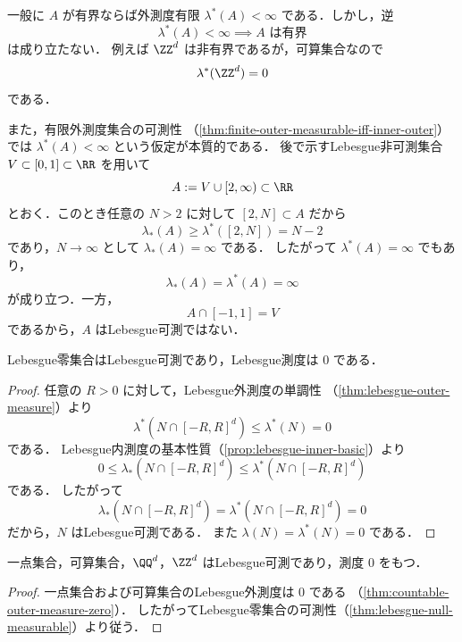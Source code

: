 \begin{remark}
一般に $A$ が有界ならば外測度有限 $\lambda^*(A)<\infty$ である．しかし，逆
\[
\lambda^*(A)<\infty \implies A \text{ は有界}
\]
は成り立たない．
例えば $\ZZ^d$ は非有界であるが，可算集合なので
\[
\lambda^*(\ZZ^d)=0
\]
である．

また，有限外測度集合の可測性
（\cref{thm:finite-outer-measurable-iff-inner-outer}）では
$\lambda^*(A)<\infty$ という仮定が本質的である．
後で示すLebesgue非可測集合 $V\subset[0,1]\subset\RR$ を用いて
\[
A:=V\cup[2,\infty)\subset\RR
\]
とおく．このとき任意の $N>2$ に対して $[2,N]\subset A$ だから
\[
\lambda_*(A)\ge \lambda^*([2,N])=N-2
\]
であり，$N\to\infty$ として $\lambda_*(A)=\infty$ である．
したがって $\lambda^*(A)=\infty$ でもあり，
\[
\lambda_*(A)=\lambda^*(A)=\infty
\]
が成り立つ．一方，
\[
A\cap[-1,1]=V
\]
であるから，$A$ はLebesgue可測ではない．
\end{remark}


\begin{theorem}[Lebesgue零集合]\label{thm:lebesgue-null-measurable}
Lebesgue零集合はLebesgue可測であり，Lebesgue測度は $0$ である．
\end{theorem}
\begin{proof}
任意の $R>0$ に対して，Lebesgue外測度の単調性
（\cref{thm:lebesgue-outer-measure}）より
\[
\lambda^*(N\cap[-R,R]^d)\le \lambda^*(N)=0
\]
である．
Lebesgue内測度の基本性質（\cref{prop:lebesgue-inner-basic}）より
\[
0\le \lambda_*(N\cap[-R,R]^d)
\le
\lambda^*(N\cap[-R,R]^d)
\]
である．
したがって
\[
\lambda_*(N\cap[-R,R]^d)
=
\lambda^*(N\cap[-R,R]^d)
=0
\]
だから，$N$ はLebesgue可測である．
また $\lambda(N)=\lambda^*(N)=0$ である．
\end{proof}

\begin{corollary}[可算集合]\label{cor:countable-lebesgue-null}
一点集合，可算集合，$\QQ^d$，$\ZZ^d$ はLebesgue可測であり，測度 $0$ をもつ．
\end{corollary}
\begin{proof}
一点集合および可算集合のLebesgue外測度は $0$ である
（\cref{thm:countable-outer-measure-zero}）．
したがってLebesgue零集合の可測性（\cref{thm:lebesgue-null-measurable}）より従う．
\end{proof}

